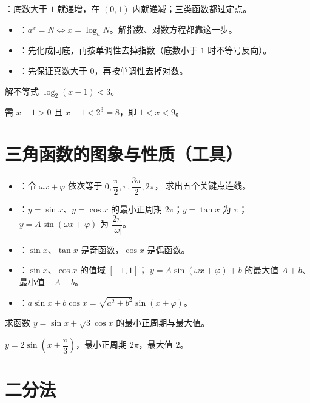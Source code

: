 ：底数大于 $1$ 就递增，在 $(0,1)$ 内就递减；三类函数都过定点。

\begin{itemize}
  \item {}：$a^x=N\iff x=\log_a N$。解指数、对数方程都靠这一步。
  \item {}：先化成同底，再按单调性去掉指数（底数小于 $1$ 时不等号反向）。
  \item {}：先保证真数大于 $0$，再按单调性去掉对数。
\end{itemize}

\begin{example}
解不等式 $\log_2(x-1)<3$。
\end{example}
\begin{solution}
需 $x-1>0$ 且 $x-1<2^3=8$，即 $1<x<9$。
\end{solution}

\section{三角函数的图象与性质（工具）}

\begin{itemize}
  \item {}：令 $\omega x+\varphi$ 依次等于 $0,\dfrac{\pi}{2},\pi,\dfrac{3\pi}{2},2\pi$，
        求出五个关键点连线。
  \item {}：$y=\sin x$、$y=\cos x$ 的最小正周期 $2\pi$；$y=\tan x$ 为 $\pi$；
        $y=A\sin(\omega x+\varphi)$ 为 $\dfrac{2\pi}{|\omega|}$。
  \item {}：$\sin x$、$\tan x$ 是奇函数，$\cos x$ 是偶函数。
  \item {}：$\sin x$、$\cos x$ 的值域 $[-1,1]$；
        $y=A\sin(\omega x+\varphi)+b$ 的最大值 $A+b$、最小值 $-A+b$。
  \item {}：$a\sin x+b\cos x=\sqrt{a^2+b^2}\sin(x+\varphi)$。
\end{itemize}

\begin{example}
求函数 $y=\sin x+\sqrt3\cos x$ 的最小正周期与最大值。
\end{example}
\begin{solution}
$y=2\sin\left(x+\dfrac{\pi}{3}\right)$，最小正周期 $2\pi$，最大值 $2$。
\end{solution}

\section{二分法}

